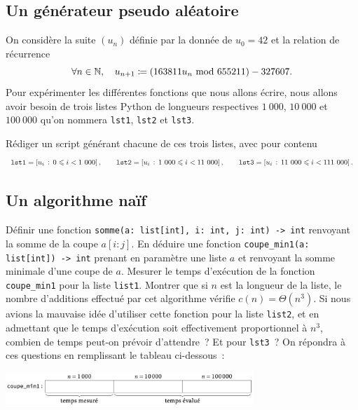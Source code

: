 \documentclass{magnoliaold}
\begin{document}
\subsection{Un générateur pseudo aléatoire}
On considère la suite $(u_n)$ définie par la donnée de $u_0=42$ et la relation de récurrence
\[\forall n\in\mathbb{N},\quad u_{n+1}\coloneqq \left(163811 u_n \ {\rm mod}\  655211\right) - 327607.\]
Pour expérimenter les différentes fonctions que nous allons écrire, nous allons avoir besoin de trois listes
Python de longueurs respectives $1\ 000$, $10\ 000$ et $100\ 000$ qu'on nommera \verb!lst1!, \verb!lst2!
et \verb !lst3!.
\begin{questions}
\question Rédiger un script générant chacune de ces trois listes, avec pour contenu
  \[\verb!lst1!=\left[u_i\,:\,0\leq i< 1\ 000\right], \qquad
    \verb!lst2!=\left[u_i\,:\,1\ 000\leq i< 11\ 000\right], \qquad 
    \verb!lst3!=\left[u_i\,:\,11\ 000\leq i< 111\ 000\right].\]
\end{questions}

\subsection{Un algorithme naïf}

\begin{questions}
\question Définir une fonction \verb!somme(a: list[int], i: int, j: int) -> int! renvoyant la somme de
  la coupe $a[i:j]$.
\question En déduire une fonction \verb!coupe_min1(a: list[int]) -> int! prenant en paramètre une liste $a$
  et renvoyant la somme minimale d'une coupe de $a$.
\question Mesurer le temps d'exécution de la fonction \verb!coupe_min1! pour la liste \verb!list1!.
\question Montrer que si $n$ est la longueur de la liste, le nombre d'additions effectué par cet algorithme
  vérifie $c(n)=\Theta(n^3)$.
\question Si nous avions la mauvaise idée d'utiliser cette fonction pour la liste \verb!list2!, et en
  admettant que le temps d'exécution soit effectivement proportionnel à $n^3$, combien de temps peut-on
  prévoir d'attendre~? Et pour \verb!lst3!~? On répondra à ces questions en remplissant le tableau
  ci-dessous~:
  \begin{center}
  \includegraphics[width=0.7\textwidth]{../../commun/images/python-tp-coupe-1}
  \end{center} 
\end{questions}
\end{document}
